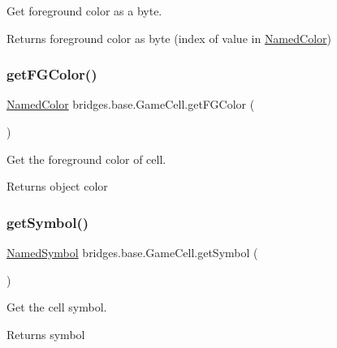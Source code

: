 Get foreground color as a byte. 

\begin{DoxyReturn}{Returns}
foreground color as byte (index of value in \hyperlink{enumbridges_1_1base_1_1_named_color}{Named\+Color}) 
\end{DoxyReturn}
\mbox{\label{classbridges_1_1base_1_1_game_cell_a9355404eb09017ca7ee3e90490e1d13b}} 
\subsubsection{\texorpdfstring{get\+F\+G\+Color()}{getFGColor()}}
{\footnotesize\ttfamily \hyperlink{enumbridges_1_1base_1_1_named_color}{Named\+Color} bridges.\+base.\+Game\+Cell.\+get\+F\+G\+Color (\begin{DoxyParamCaption}{ }\end{DoxyParamCaption})}



Get the foreground color of cell. 

\begin{DoxyReturn}{Returns}
object color 
\end{DoxyReturn}
\mbox{\label{classbridges_1_1base_1_1_game_cell_a5c5ce5b363e442ac10c8588cbec77511}} 
\subsubsection{\texorpdfstring{get\+Symbol()}{getSymbol()}}
{\footnotesize\ttfamily \hyperlink{enumbridges_1_1base_1_1_named_symbol}{Named\+Symbol} bridges.\+base.\+Game\+Cell.\+get\+Symbol (\begin{DoxyParamCaption}{ }\end{DoxyParamCaption})}



Get the cell symbol. 

\begin{DoxyReturn}{Returns}
symbol 
\end{DoxyReturn}
\mbox{\label{classbridges_1_1base_1_1_game_cell_a6b5589c577f2d89c0e98436eea667d77}} 
